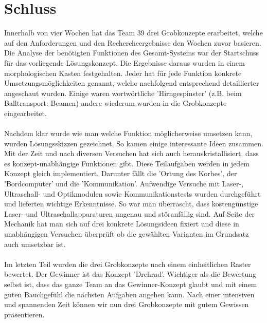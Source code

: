 \section{Schluss}
Innerhalb von vier Wochen hat das Team 39 drei Grobkonzepte erarbeitet, welche auf den Anforderungen und den Rechercheergebnisse den Wochen zuvor basieren. Die Analyse der benötigten Funktionen des Gesamt-Systems war der Startschuss für das vorliegende Lösungskonzept. Die Ergebnisse daraus wurden in einem morphologischen Kasten festgehalten. Jeder hat für jede Funktion konkrete Umsetzungsmöglichkeiten genannt, welche nachfolgend entsprechend detaillierter angeschaut wurden. Einige waren wortwörtliche 'Hirngespinster' (z.B. beim Balltransport: Beamen) andere wiederum wurden in die Grobkonzepte eingearbeitet. \\
\\
Nachdem klar wurde wie man welche Funktion möglicherweise umsetzen kann, wurden Lösungsskizzen gezeichnet. So kamen einige interessante Ideen zusammen. Mit der Zeit und nach diversen Versuchen hat sich auch herauskristallisiert, dass es konzept-unabhängige Funktionen gibt. Diese Teilaufgaben werden in jedem Konzept gleich implementiert. Darunter fällt die 'Ortung des Korbes', der 'Bordcomputer' und die 'Kommunikation'. Aufwendige Versuche mit Laser-, Ultraschall- und Optikmodulen sowie Kommunikationstests wurden durchgeführt und lieferten wichtige Erkenntnisse. So war man überrascht, dass kostengünstige Laser- und Ultraschallapparaturen ungenau und störanfällig sind. Auf Seite der Mechanik hat man sich auf drei konkrete Lösungsideen fixiert und diese in unabhängigen Versuchen überprüft ob die gewählten Varianten im Grundsatz auch umsetzbar ist.\\
\\
Im letzten Teil wurden die drei Grobkonzepte nach einem einheitlichen Raster bewertet. Der Gewinner ist das Konzept 'Drehrad'. Wichtiger als die Bewertung selbst ist, dass das ganze Team an das Gewinner-Konzept glaubt und mit einem guten Bauchgefühl die nächsten Aufgaben angehen kann. Nach einer intensiven und spannenden Zeit können wir nun drei Grobkonzepte mit gutem Gewissen präsentieren.